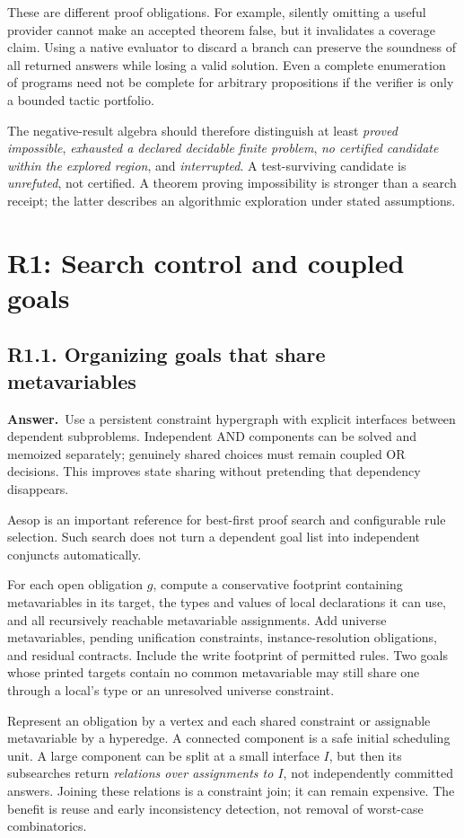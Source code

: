 \documentclass[11pt,a4paper]{article}
\newcommand{\qid}[3]{\subsection{#2. #3}\label{#1}}
\newcommand{\answer}{\noindent\textbf{Answer.}\ }
\theoremstyle{remark}
\begin{document}
These are different proof obligations. For example, silently omitting a useful provider cannot make an accepted theorem false, but it invalidates a coverage claim. Using a native evaluator to discard a branch can preserve the soundness of all returned answers while losing a valid solution. Even a complete enumeration of programs need not be complete for arbitrary propositions if the verifier is only a bounded tactic portfolio.

The negative-result algebra should therefore distinguish at least \emph{proved impossible}, \emph{exhausted a declared decidable finite problem}, \emph{no certified candidate within the explored region}, and \emph{interrupted}. A test-surviving candidate is \emph{unrefuted}, not certified. A theorem proving impossibility is stronger than a search receipt; the latter describes an algorithmic exploration under stated assumptions.

\section{R1: Search control and coupled goals}\label{sec:r1}

\qid{q11}{R1.1}{Organizing goals that share metavariables}
\answer Use a persistent constraint hypergraph with explicit interfaces between dependent subproblems. Independent AND components can be solved and memoized separately; genuinely shared choices must remain coupled OR decisions. This improves state sharing without pretending that dependency disappears.

Aesop is an important reference for best-first proof search and configurable rule selection. Such search does not turn a dependent goal list into independent conjuncts automatically.~\cite{aesop}

For each open obligation $g$, compute a conservative footprint containing metavariables in its target, the types and values of local declarations it can use, and all recursively reachable metavariable assignments. Add universe metavariables, pending unification constraints, instance-resolution obligations, and residual contracts. Include the write footprint of permitted rules. Two goals whose printed targets contain no common metavariable may still share one through a local's type or an unresolved universe constraint.

Represent an obligation by a vertex and each shared constraint or assignable metavariable by a hyperedge. A connected component is a safe initial scheduling unit. A large component can be split at a small interface $I$, but then its subsearches return \emph{relations over assignments to $I$}, not independently committed answers. Joining these relations is a constraint join; it can remain expensive. The benefit is reuse and early inconsistency detection, not removal of worst-case combinatorics.
\end{document}
